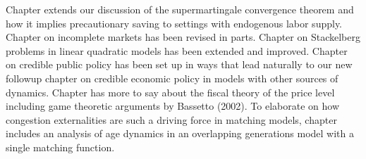  Chapter
 extends our discussion of the  supermartingale
convergence theorem and how it implies precautionary saving
 to settings with endogenous labor supply.
Chapter  on incomplete markets has been revised in parts.  Chapter   on Stackelberg problems in linear quadratic models has been extended and improved.
Chapter   on credible public policy has been set up in  ways that lead naturally to our new followup  chapter  on credible economic policy
in models with other sources of dynamics.
Chapter  has more to say about the fiscal theory of the price level
including game theoretic arguments by Bassetto (2002).
To elaborate on how congestion externalities are such a driving force
in matching models, chapter 
includes an analysis of age dynamics in an overlapping generations model with
a single matching function.


%
%
%
%

